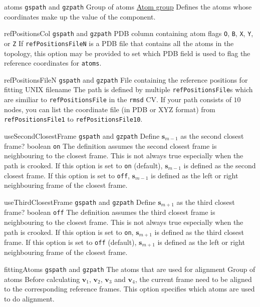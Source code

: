 \begin{cvcoptions}
\item %
  \key
    {atoms}{%
    \texttt{gspath} and \texttt{gzpath}}{%
    Group of atoms}{%
    \hyperref[sec:colvar_atom_groups]{Atom group}}{%
    Defines the atoms whose coordinates make up the value of the component.}

\item %
  \key
    {refPositionsCol}{%
    \texttt{gspath} and \texttt{gzpath}}{%
    PDB column containing atom flags}{%
    \texttt{O}, \texttt{B}, \texttt{X}, \texttt{Y}, or \texttt{Z}}{%
    If \texttt{refPositionsFileN} is a PDB file that contains all the atoms in the topology, this option may be provided to set which PDB field is used to flag the reference coordinates for \texttt{atoms}.}

\item %
  \key
    {refPositionsFileN}{%
    \texttt{gspath} and \texttt{gzpath}}{%
    File containing the reference positions for fitting}{%
    UNIX filename}{%
		The path is defined by multiple \texttt{refPositionsFile}s which are similiar to \texttt{refPositionsFile} in the \texttt{rmsd} CV. If your path consists of $10$ nodes, you can list the coordinate file (in PDB or XYZ format) from \texttt{refPositionsFile1} to \texttt{refPositionsFile10}.
    }

\item %
  \keydef
    {useSecondClosestFrame}{%
    \texttt{gspath} and \texttt{gzpath}}{%
    Define $\mathbf{s}_{m-1}$ as the second closest frame?}{%
    boolean}{%
    \texttt{on}}{%
    The definition assumes the second closest frame is neighbouring to the closest frame. This is not always true especially when the path is crooked. If this option is set to \texttt{on} (default), $\mathbf{s}_{m-1}$ is defined as the second closest frame. If this option is set to \texttt{off}, $\mathbf{s}_{m-1}$ is defined as the left or right neighbouring frame of the closest frame.
  }

\item %
  \keydef
    {useThirdClosestFrame}{%
    \texttt{gspath} and \texttt{gzpath}}{%
    Define $\mathbf{s}_{m+1}$ as the third closest frame?}{%
    boolean}{%
    \texttt{off}}{%
    The definition assumes the third closest frame is neighbouring to the closest frame. This is not always true especially when the path is crooked. If this option is set to \texttt{on}, $\mathbf{s}_{m+1}$ is defined as the third closest frame. If this option is set to \texttt{off} (default), $\mathbf{s}_{m+1}$ is defined as the left or right neighbouring frame of the closest frame.
  }

\item %
  \key
    {fittingAtoms}{%
    \texttt{gspath} and \texttt{gzpath}}{%
    The atoms that are used for alignment}{%
    Group of atoms}{%
		Before calculating $\mathbf{v}_1$, $\mathbf{v}_2$, $\mathbf{v}_3$ and $\mathbf{v}_4$, the current frame need to be aligned to the corresponding reference frames. This option specifies which atoms are used to do alignment.
    }

\end{cvcoptions}

